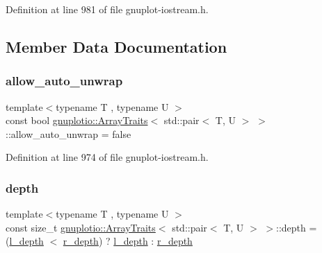 Definition at line 981 of file gnuplot-\/iostream.\+h.



\subsection{Member Data Documentation}
\mbox{\label{classgnuplotio_1_1_array_traits_3_01std_1_1pair_3_01_t_00_01_u_01_4_01_4_afff9ebffb39ab8660bb59ffcc7d8a2e5}} 
\subsubsection{\texorpdfstring{allow\+\_\+auto\+\_\+unwrap}{allow\_auto\_unwrap}}
{\footnotesize\ttfamily template$<$typename T , typename U $>$ \\
const bool \hyperlink{classgnuplotio_1_1_array_traits}{gnuplotio\+::\+Array\+Traits}$<$ std\+::pair$<$ T, U $>$ $>$\+::allow\+\_\+auto\+\_\+unwrap = false\hspace{0.3cm}{\ttfamily [static]}}



Definition at line 974 of file gnuplot-\/iostream.\+h.

\mbox{\label{classgnuplotio_1_1_array_traits_3_01std_1_1pair_3_01_t_00_01_u_01_4_01_4_a11b3be89ac9506fcfcceb318acc7e2bf}} 
\subsubsection{\texorpdfstring{depth}{depth}}
{\footnotesize\ttfamily template$<$typename T , typename U $>$ \\
const size\+\_\+t \hyperlink{classgnuplotio_1_1_array_traits}{gnuplotio\+::\+Array\+Traits}$<$ std\+::pair$<$ T, U $>$ $>$\+::depth = (\hyperlink{classgnuplotio_1_1_array_traits_3_01std_1_1pair_3_01_t_00_01_u_01_4_01_4_ae8be9661c88a8970da3d87c1afc063dc}{l\+\_\+depth} $<$ \hyperlink{classgnuplotio_1_1_array_traits_3_01std_1_1pair_3_01_t_00_01_u_01_4_01_4_a1b7e7f8976a5d0ed20b93ede3e25a546}{r\+\_\+depth}) ? \hyperlink{classgnuplotio_1_1_array_traits_3_01std_1_1pair_3_01_t_00_01_u_01_4_01_4_ae8be9661c88a8970da3d87c1afc063dc}{l\+\_\+depth} \+: \hyperlink{classgnuplotio_1_1_array_traits_3_01std_1_1pair_3_01_t_00_01_u_01_4_01_4_a1b7e7f8976a5d0ed20b93ede3e25a546}{r\+\_\+depth}\hspace{0.3cm}{\ttfamily [static]}}



